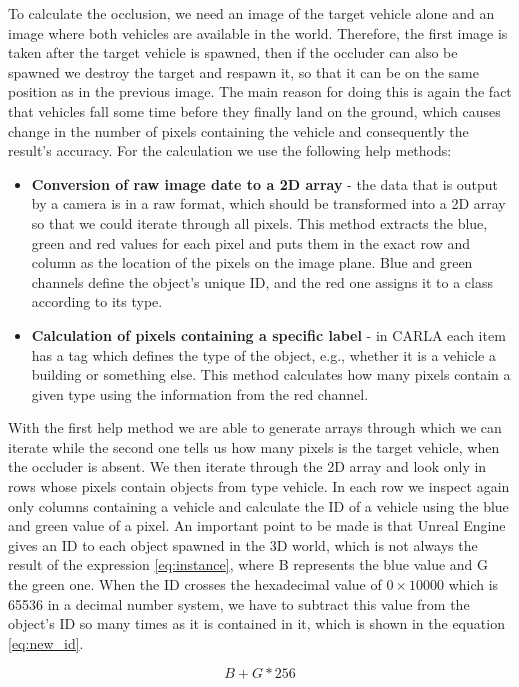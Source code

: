  To calculate the occlusion, we need an image of the target vehicle alone and an image where both vehicles are available in the world. Therefore, the first image is taken after the target vehicle is spawned, then if the occluder can also be spawned we destroy the target and respawn it, so that it can be on the same position as in the previous image. The main reason for doing this is again the fact that vehicles fall some time before they finally land on the ground, which causes change in the number of pixels containing the vehicle and consequently the result's accuracy. For the calculation we use the following help methods:
 \begin{itemize}
     \item \textbf{Conversion of raw image date to a 2D array} - the data that is output by a camera is in a raw format, which should be transformed into a 2D array so that we could iterate through all pixels. This method extracts the blue, green and red values for each pixel and puts them in the exact row and column as the location of the pixels on the image plane. Blue and green channels define the object's unique ID, and the red one assigns it to a class according to its type.
     \item \textbf{Calculation of pixels containing a specific label} - in CARLA each item has a tag which defines the type of the object, e.g., whether it is a vehicle a building or something else. This method calculates how many pixels contain a given type using the information from the red channel. 
 \end{itemize}

With the first help method we are able to generate arrays through which we can iterate while the second one tells us how many pixels is the target vehicle, when the occluder is absent. We then iterate through the 2D array and look only in rows whose pixels contain objects from type vehicle. In each row we inspect again only columns containing a vehicle and calculate the ID of a vehicle using the blue and green value of a pixel. An important point to be made is that Unreal Engine gives an ID to each object spawned in the 3D world, which is not always the result of the expression \ref{eq:instance}, where B represents the blue value and G the green one.
When the ID crosses the hexadecimal value of $0\times10000$ which is 65536 in a decimal number system, we have to subtract this value from the object's ID so many times as it is contained in it, which is shown in the equation \ref{eq:new_id}.

\begin{equation}B + G * 256\label{eq:instance}\end{equation}

